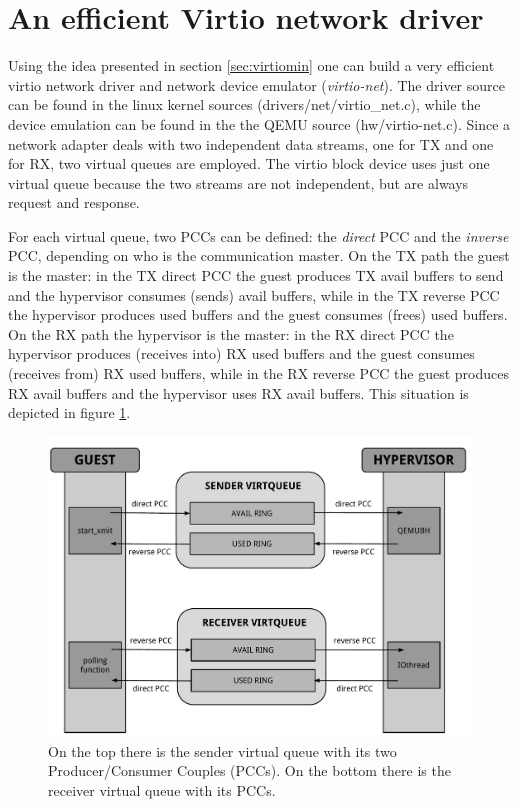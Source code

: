 \section{An efficient Virtio network driver}
\label{sec:virtionet}
Using the idea presented in section \ref{sec:virtiomin} one can build a very efficient virtio network driver and network device emulator 
(\emph{virtio-net}). The driver source can be found in the linux kernel sources (drivers/net/virtio\_net.c), while the device
emulation can be found in the the QEMU source (hw/virtio-net.c).
Since a network adapter deals with two independent data streams, one for TX and one for RX, two virtual queues are employed. The virtio
block device uses just one virtual queue because the two streams are not independent, but are always request and response.

\vspace{0.5cm}

For each virtual queue, two PCCs can be defined: the \emph{direct} PCC and the \emph{inverse} PCC, depending on who is the communication
master.
On the TX path the guest is the master: in the TX direct PCC the guest produces TX avail buffers to send and the hypervisor consumes (sends)
avail buffers, while in the TX reverse PCC the hypervisor produces used buffers and the guest consumes (frees) used buffers.
On the RX path the hypervisor is the master: in the RX direct PCC the hypervisor produces (receives into) RX used buffers and the guest
consumes (receives from) RX used buffers, while in the RX reverse PCC the guest produces RX avail buffers and the hypervisor uses RX
avail buffers. This situation is depicted in figure \ref{fig:pccs}.

\begin{figure}[bt]
\centering
\includegraphics[scale = 0.55]{pccs.pdf}
\caption{On the top there is the sender virtual queue with its two Producer/Consumer Couples (PCCs). On the bottom there is the
	 receiver virtual queue with its PCCs.}
\label{fig:pccs}
\end{figure}


